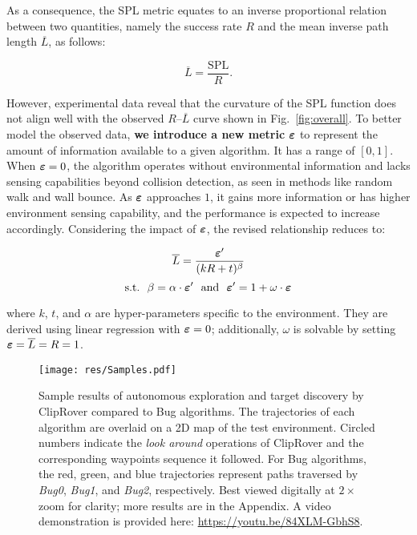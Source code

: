 \noindent
As a consequence, the SPL metric equates to an inverse proportional relation between two quantities, namely the success rate $R$ and the mean inverse path length $\overline{L}$, as follows:

\begin{equation}
\overline{L} = \frac{\text{SPL}}{R}.
\end{equation}

\noindent
However, experimental data reveal that the curvature of the SPL function does not align well with the observed $R$--$\overline{L}$ curve shown in Fig.~\ref{fig:overall}. To better model the observed data, \textbf{we introduce a new metric $\bm{\varepsilon}$} to represent the amount of information available to a given algorithm. It has a range of $[0, 1]$. When $\bm{\varepsilon}=0$, the algorithm operates without environmental information and lacks sensing capabilities beyond collision detection, as seen in methods like random walk and wall bounce. As $\bm{\varepsilon}$ approaches $1$, it gains more information or has higher environment sensing capability, and the performance is expected to increase accordingly. Considering the impact of $\bm{\varepsilon}$, the revised relationship reduces to:

\begin{equation}
\overline{L} = \frac{\bm{\varepsilon}^\prime}{(kR + t) ^ \beta}
\label{eq:exp/epsilon}
\end{equation} \vspace{-2pt}
\begin{equation}
\text{s.t.} ~ ~ \beta = \alpha \cdot \bm{\varepsilon}^\prime ~ ~ \text{and} ~ ~ \bm{\varepsilon}^\prime = 1 + \omega\cdot\bm{\varepsilon}
\end{equation}

\noindent
where $k$, $t$, and $\alpha$ are hyper-parameters specific to the environment. They are derived using linear regression with $\bm{\varepsilon}=0$; additionally, $\omega$ is solvable by setting $\bm{\varepsilon} = \overline{L} = R = 1$.




\begin{figure*}
  \centering
  \texttt{[image: res/Samples.pdf]}%
  \caption{
      Sample results of autonomous exploration and target discovery by ClipRover compared to Bug algorithms. %
      The trajectories of each algorithm are overlaid on a 2D map of the test environment. Circled numbers indicate the \textit{look around} operations of ClipRover and the corresponding waypoints sequence it followed. For Bug algorithms, the red, green, and blue trajectories represent paths traversed by \textit{Bug0}, \textit{Bug1}, and \textit{Bug2}, respectively. Best viewed digitally at $2\times$ zoom for clarity; more results are in the Appendix. A video demonstration is provided here: \url{https://youtu.be/84XLM-GbhS8}.
  }
  \label{fig:exp}
  \vspace{-2mm}
\end{figure*}


